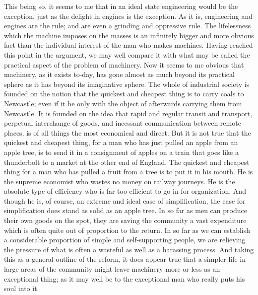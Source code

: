 \documentclass{book}
\begin{document}
This being so, it seems to me that in an ideal state engineering would be the exception, just as the delight in engines is the exception. As it is, engineering and engines are the rule; and are even a grinding and oppressive rule. The lifelessness which the machine imposes on the masses is an infinitely bigger and more obvious fact than the individual interest of the man who makes machines. Having reached this point in the argument, we may well compare it with what may be called the practical aspect of the problem of machinery. Now it seems to me obvious that machinery, as it exists to-day, has gone almost as much beyond its practical sphere as it has beyond its imaginative sphere. The whole of industrial society is founded on the notion that the quickest and cheapest thing is to carry coals to Newcastle; even if it be only with the object of afterwards carrying them from Newcastle. It is founded on the idea that rapid and regular transit and transport, perpetual interchange of goods, and incessant communication between remote places, is of all things the most economical and direct. But it is not true that the quickest and cheapest thing, for a man who has just pulled an apple from an apple tree, is to send it in a consignment of apples on a train that goes like a thunderbolt to a market at the other end of England. The quickest and cheapest thing for a man who has pulled a fruit from a tree is to put it in his mouth. He is the supreme economist who wastes no money on railway journeys. He is the absolute type of efficiency who is far too efficient to go in for organization. And though he is, of course, an extreme and ideal case of simplification, the case for simplification does stand as solid as an apple tree. In so far as men can produce their own goods on the spot, they are saving the community a vast expenditure which is often quite out of proportion to the return. In so far as we can establish a considerable proportion of simple and self-supporting people, we are relieving the pressure of what is often a wasteful as well as a harassing process. And taking this as a general outline of the reform, it does appear true that a simpler life in large areas of the community might leave machinery more or less as an exceptional thing; as it may well be to the exceptional man who really puts his soul into it.
\end{document}
